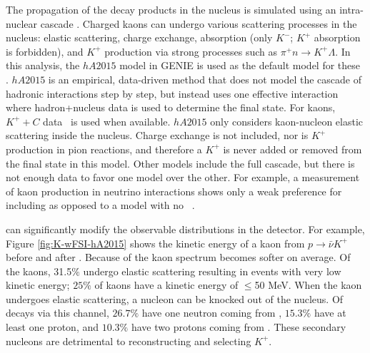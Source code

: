 The propagation of the decay products in the nucleus is simulated using an intra-nuclear cascade . 
Charged kaons can undergo various scattering processes in the nucleus: elastic scattering, charge exchange, absorption (only $K^{-}$; $K^{+}$ absorption is forbidden), and $K^{+}$ production via strong processes such as $\pi^{+}n \rightarrow K^{+} \Lambda$.  In this analysis, the $hA2015$ model in GENIE is used as the default model for these .  $hA2015$ is an empirical, data-driven method that does not model the cascade of hadronic interactions step by step, but instead uses one effective interaction where hadron+nucleus data is used to determine the final state.
For kaons, $K^{+}+C$ data~\cite{Bugg:1968zz,Friedman:1997eq}
is used when available. $hA2015$ only considers kaon-nucleon elastic scattering inside the nucleus.  Charge exchange is not included, nor is $K^+$ production in pion reactions, and therefore a $K^+$ is never added or removed from the final state in this model. Other  models include the full cascade, but there is not enough data to favor one model over the other.  For example, a measurement of kaon production in neutrino interactions shows only a weak preference for including  as opposed to a model with no ~\cite{Marshall:2016rrn}.

 can significantly modify the observable distributions in the detector.  For example, Figure \ref{fig:K-wFSI-hA2015} shows the kinetic energy of a kaon from $p\rightarrow \bar{\nu}K^{+}$ before and after . Because of  the kaon spectrum becomes softer on average. Of the kaons, 31.5$\%$  undergo elastic scattering resulting in events with very low kinetic energy;  $25\%$ of kaons have a kinetic energy of $\le$50 MeV. When the kaon undergoes elastic scattering, a nucleon can be knocked out of the nucleus. Of decays via this channel, $26.7\%$  have one neutron coming from , $15.3\%$ have at least one proton, and $10.3\%$ have two protons coming from . These secondary nucleons are detrimental to reconstructing and selecting  $K^{+}$.

